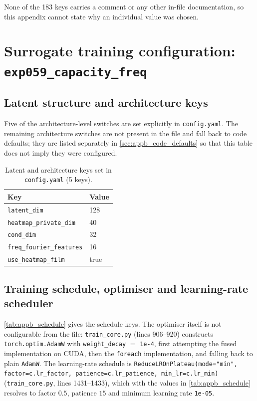 None of the 183 keys carries a comment or any other in-file documentation, so this
appendix cannot state why an individual value was chosen.

\section{Surrogate training configuration: \texttt{exp059\_capacity\_freq}}
\label{sec:appb_exp059_config}

\subsection{Latent structure and architecture keys}
\label{subsec:appb_arch}

Five of the architecture-level switches are set explicitly in \texttt{config.yaml}. The
remaining architecture switches are not present in the file and fall back to code
defaults; they are listed separately in \autoref{sec:appb_code_defaults} so that this
table does not imply they were configured.

\begin{table}[htbp]
\centering
\caption{Latent and architecture keys set in \texttt{config.yaml} (5 keys).}
\label{tab:appb_arch}
\begin{tabular}{@{}ll@{}}
\hline
Key & Value \\
\hline
\texttt{latent\_dim} & 128 \\
\texttt{heatmap\_private\_dim} & 40 \\
\texttt{cond\_dim} & 32 \\
\texttt{freq\_fourier\_features} & 16 \\
\texttt{use\_heatmap\_film} & true \\
\hline
\end{tabular}
\end{table}

\subsection{Training schedule, optimiser and learning-rate scheduler}
\label{subsec:appb_schedule}

\autoref{tab:appb_schedule} gives the schedule keys. The optimiser itself is not
configurable from the file: \texttt{train\_core.py} (lines 906--920) constructs
\texttt{torch.optim.AdamW} with \texttt{weight\_decay} $=$ \texttt{1e-4}, first
attempting the fused implementation on CUDA, then the \texttt{foreach} implementation,
and falling back to plain \texttt{AdamW}. The learning-rate schedule is
\texttt{ReduceLROnPlateau(mode="min", factor=c.lr\_factor, patience=c.lr\_patience,
min\_lr=c.lr\_min)} (\texttt{train\_core.py}, lines 1431--1433), which with the values in
\autoref{tab:appb_schedule} resolves to factor $0.5$, patience $15$ and minimum learning
rate \texttt{1e-05}.

